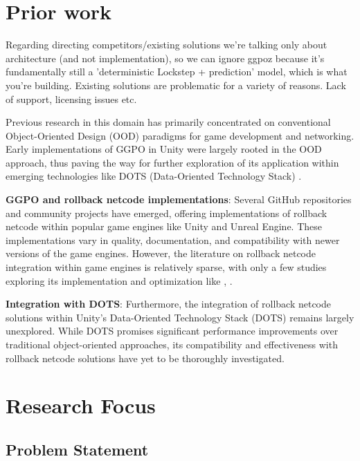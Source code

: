 \section{Prior work}

Regarding directing competitors/existing solutions we're talking only about architecture (and not implementation), so we can ignore ggpoz because it's fundamentally still a 'deterministic Lockstep + prediction' model, which is what you're building. Existing solutions are problematic for a variety of reasons. Lack of support, licensing issues etc. %

Previous research in this domain has primarily concentrated on conventional Object-Oriented Design (OOD) paradigms for game development and networking. Early implementations of GGPO in Unity were largely rooted in the OOD approach, thus paving the way for further exploration of its application within emerging technologies like DOTS (Data-Oriented Technology Stack) \cite{UnityGGPO}.

\noindent\textbf{GGPO and rollback netcode implementations}:
Several GitHub repositories and community projects have emerged, offering implementations of rollback netcode within popular game engines like Unity and Unreal Engine. These implementations vary in quality, documentation, and compatibility with newer versions of the game engines. However, the literature on rollback netcode integration within game engines is relatively sparse, with only a few studies exploring its implementation and optimization like \cite{ECS_unity_implementation}, \cite{Lockstep_Unity}.

\noindent\textbf{Integration with DOTS}:
Furthermore, the integration of rollback netcode solutions within Unity's Data-Oriented Technology Stack (DOTS) remains largely unexplored. While DOTS promises significant performance improvements over traditional object-oriented approaches, its compatibility and effectiveness with rollback netcode solutions have yet to be thoroughly investigated.

\section{Research Focus}

\subsection{Problem Statement}

